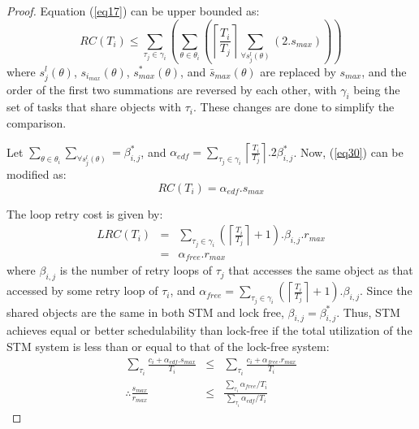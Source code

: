 \documentclass[letter]{sig-alternate}
\begin{document}
\begin{proof}
Equation (\ref{eq17}) can be upper bounded as:
\begin{equation}
RC\left(T_{i}\right) \le \sum_{\tau_{j}\in\gamma_{i}}\left(\sum_{\theta\in\theta_{i}}\left(\left\lceil\frac{T_{i}}{T_{j}}\right\rceil\sum_{\forall s_{j}^{l}\left(\theta\right)}\left(2.s_{max}\right)\right)\right)
\label{eq30}
\end{equation}
where $s_{j}^{l}\left(\theta\right)$, $s_{i_{max}}\left(\theta\right)$,
$s_{max}^{*}\left(\theta\right)$, and $\bar{s}_{max}\left(\theta\right)$ are replaced by $s_{max}$, and the order of the first two summations are reversed
by each other, 
with $\gamma_{i}$ being the set of tasks that share objects
with $\tau_{i}$. These changes are done to simplify the comparison.

Let $\sum_{\theta\in\theta_{i}}\sum_{\forall s_{j}^{l}\left(\theta\right)}=\beta_{i,j}^{*}$, and $\alpha_{edf}=\sum_{\tau_{j}\in\gamma_{i}}\left\lceil\frac{T_{i}}{T_{j}}\right\rceil.2\beta_{i,j}^*$. Now, (\ref{eq30}) can be modified as:
\begin{equation}
RC\left(T_{i}\right)=\alpha_{edf}.s_{max}
\label{eq31}
\end{equation}

The loop retry cost is given by:
\begin{eqnarray}
LRC\left(T_i\right)&=&\sum_{\tau_{j}\in\gamma_{i}}\left(\left\lceil\frac{T_{i}}{T_{j}}\right\rceil+1\right).\beta_{i,j}.r_{max}\nonumber \\
&=& \alpha_{free} . r_{max} \label{eq32}
\end{eqnarray}
where $\beta_{i,j}$ is the number of retry loops of $\tau_{j}$ that accesses the same object as that accessed by some retry loop of $\tau_{i}$, and $\alpha_{free} = \sum_{\tau_{j}\in\gamma_{i}}\left(\left\lceil\frac{T_{i}}{T_{j}}\right\rceil + 1 \right).\beta_{i,j}$.
Since the shared objects are the same in both STM and lock free, $\beta_{i,j}=\beta_{i,j}^{*}$.
Thus, STM achieves equal or better schedulability 
than lock-free if the total utilization of the STM system is less than or equal to that of the lock-free system:
\begin{eqnarray}
\sum_{\tau_{i}}\frac{c_{i}+\alpha_{edf}.s_{max}} {T_{i}} & \le & \sum_{\tau_{i}}\frac{c_{i}+\alpha_{free}.r_{max}}{T_{i}} \nonumber \\
\therefore\frac{s_{max}}{r_{max}} & \le & \frac{\sum_{\tau_{i}}\alpha_{free}/T_{i}}{\sum_{\tau_{i}}\alpha_{edf}/T_{i}}\end{eqnarray}



\end{proof}
\end{document}
